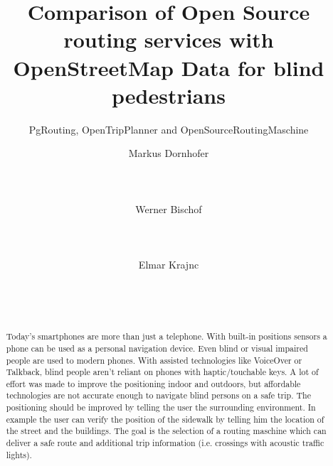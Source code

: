 \documentclass{sig-alternate}
\begin{document}
%

\title{Comparison of Open Source routing services with OpenStreetMap Data for blind pedestrians}
\subtitle{PgRouting, OpenTripPlanner and OpenSourceRoutingMaschine}


\author{
\alignauthor Markus Dornhofer\\
       \\
       \\
       \\
\alignauthor Werner Bischof\\
       \\
       \\
       \\
\alignauthor Elmar Krajnc\\
       \\
       \\
       \\
}

\maketitle

\begin{abstract}
Today’s smartphones are more than just a telephone. With built-in positions sensors a phone can be used as a personal navigation device. Even blind or visual impaired people are used to modern phones. With assisted technologies like VoiceOver or Talkback, blind people aren’t reliant on phones with haptic/touchable keys. A lot of effort was made to improve the positioning indoor and outdoors, but affordable technologies are not accurate enough to navigate blind persons on a safe trip. The positioning should be improved by telling the user the surrounding environment. In example the user can verify the position of the sidewalk by telling him the location of the street and the buildings. The goal is the selection of a routing maschine which can deliver a safe route and additional trip information (i.e. crossings with acoustic traffic lights). 
\end{abstract}
\end{document}
